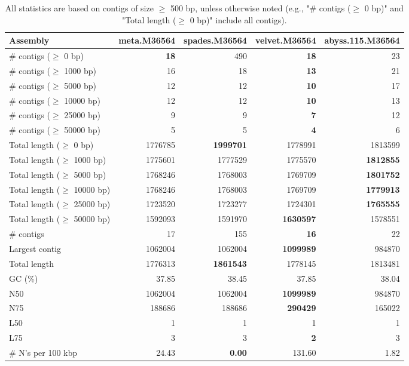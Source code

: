 \documentclass[12pt,a4paper]{article}
\begin{document}
\begin{table}[ht]
\begin{center}
\caption{All statistics are based on contigs of size $\geq$ 500 bp, unless otherwise noted (e.g., "\# contigs ($\geq$ 0 bp)" and "Total length ($\geq$ 0 bp)" include all contigs).}
\begin{tabular}{|l*{4}{|r}|}
\hline
Assembly & meta.M36564 & spades.M36564 & velvet.M36564 & abyss.115.M36564 \\ \hline
\# contigs ($\geq$ 0 bp) & {\bf 18} & 490 & {\bf 18} & 23 \\ \hline
\# contigs ($\geq$ 1000 bp) & 16 & 18 & {\bf 13} & 21 \\ \hline
\# contigs ($\geq$ 5000 bp) & 12 & 12 & {\bf 10} & 17 \\ \hline
\# contigs ($\geq$ 10000 bp) & 12 & 12 & {\bf 10} & 13 \\ \hline
\# contigs ($\geq$ 25000 bp) & 9 & 9 & {\bf 7} & 12 \\ \hline
\# contigs ($\geq$ 50000 bp) & 5 & 5 & {\bf 4} & 6 \\ \hline
Total length ($\geq$ 0 bp) & 1776785 & {\bf 1999701} & 1778991 & 1813599 \\ \hline
Total length ($\geq$ 1000 bp) & 1775601 & 1777529 & 1775570 & {\bf 1812855} \\ \hline
Total length ($\geq$ 5000 bp) & 1768246 & 1768003 & 1769709 & {\bf 1801752} \\ \hline
Total length ($\geq$ 10000 bp) & 1768246 & 1768003 & 1769709 & {\bf 1779913} \\ \hline
Total length ($\geq$ 25000 bp) & 1723520 & 1723277 & 1724301 & {\bf 1765555} \\ \hline
Total length ($\geq$ 50000 bp) & 1592093 & 1591970 & {\bf 1630597} & 1578551 \\ \hline
\# contigs & 17 & 155 & {\bf 16} & 22 \\ \hline
Largest contig & 1062004 & 1062004 & {\bf 1099989} & 984870 \\ \hline
Total length & 1776313 & {\bf 1861543} & 1778145 & 1813481 \\ \hline
GC (\%) & 37.85 & 38.45 & 37.85 & 38.04 \\ \hline
N50 & 1062004 & 1062004 & {\bf 1099989} & 984870 \\ \hline
N75 & 188686 & 188686 & {\bf 290429} & 165022 \\ \hline
L50 & 1 & 1 & 1 & 1 \\ \hline
L75 & 3 & 3 & {\bf 2} & 3 \\ \hline
\# N's per 100 kbp & 24.43 & {\bf 0.00} & 131.60 & 1.82 \\ \hline
\end{tabular}
\end{center}
\end{table}
\end{document}
